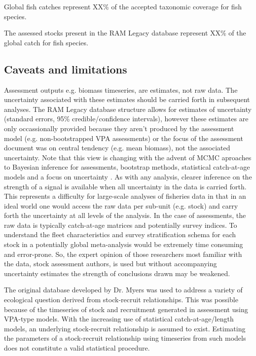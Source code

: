 \documentclass[letterpaper,12pt]{article}
\begin{document}
Global fish catches represent XX\% of the accepted taxonomic coverage
for fish species.


The assessed stocks present in the RAM Legacy database represent XX\%
of the global catch for fish species.


\subsection{Caveats and limitations}
Assessment outputs e.g. biomass timeseries, are estimates, not raw
data. The uncertainty associated with these estimates should be
carried forth in subsequent analyses. The RAM Legacy database
structure allows for estimates of uncertainty (standard errors, 95\%
credible/confidence intervals), however these estimates are only
occassionally provided because they aren't produced by the assessment
model (e.g. non-bootstrapped VPA assessments) or the focus of the
assessment document was on central tendency (e.g. mean biomass), not
the associated uncertainty. Note that this view is changing with the
advent of MCMC aproaches to Bayesian inference for assessments,
bootstrap methods, statistical catch-at-age models and a focus on
uncertainty \citep{Walters:Maguire:1996:reviews}. As with any
analysis, clearer inference on the strength of a signal is available
when all uncertainty in the data is carried forth. This represents a
difficulty for large-scale analyses of fisheries data in that in an
ideal world one would access the raw data per sub-unit (e.g. stock)
and carry forth the uncertainty at all levels of the analysis. In the
case of assessments, the raw data is typically catch-at-age matrices
and potentially survey indices. To understand the fleet
characteristics and survey stratification schema for each stock in a
potentially global meta-analysis would be extremely time consuming and
error-prone. So, the expert opinion of those researchers most familiar
with the data, stock assessment authors, is used but without
accompanying uncertainty estimates the strength of conclusions drawn
may be weakened.

The original database developed by Dr. Myers was used to address a
variety of ecological question derived from stock-recruit
relationships. This was possible because of the timeseries of stock
and recruitment generated in assessment using VPA-type models. With
the increasing use of statistical catch-at-age/length models, an
underlying stock-recruit relationship is assumed to exist. Estimating
the parameters of a stock-recruit relationship using timeseries from
such models does not constitute a valid statistical procedure. 
\end{document}
